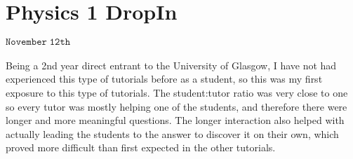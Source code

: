 \section{Physics 1 DropIn}
\begin{flushright}
$\mathtt{November \; 12th}$
\end{flushright}
\paragraph{}

Being a 2nd year direct entrant to the University of Glasgow, I have not had experienced this type of tutorials before as a student, so this was my first exposure to this type of tutorials. The student:tutor ratio was very close to one so every tutor was mostly helping one of the students, and therefore there were longer and more meaningful questions. The longer interaction also helped with actually leading the students to the answer to discover it on their own, which proved more difficult than first expected in the other tutorials.

